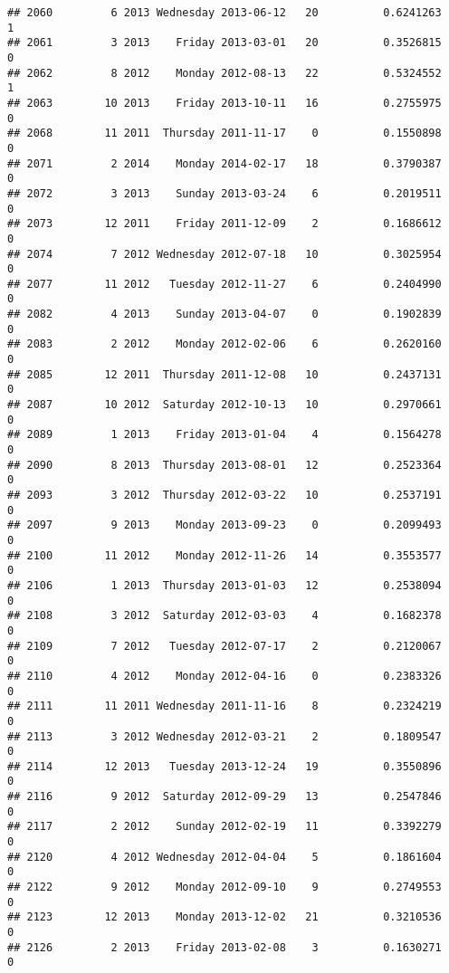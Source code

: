 \documentclass[
]{article}
\begin{document}
\begin{verbatim}
## 2060         6 2013 Wednesday 2013-06-12   20          0.6241263             1
## 2061         3 2013    Friday 2013-03-01   20          0.3526815             0
## 2062         8 2012    Monday 2012-08-13   22          0.5324552             1
## 2063        10 2013    Friday 2013-10-11   16          0.2755975             0
## 2068        11 2011  Thursday 2011-11-17    0          0.1550898             0
## 2071         2 2014    Monday 2014-02-17   18          0.3790387             0
## 2072         3 2013    Sunday 2013-03-24    6          0.2019511             0
## 2073        12 2011    Friday 2011-12-09    2          0.1686612             0
## 2074         7 2012 Wednesday 2012-07-18   10          0.3025954             0
## 2077        11 2012   Tuesday 2012-11-27    6          0.2404990             0
## 2082         4 2013    Sunday 2013-04-07    0          0.1902839             0
## 2083         2 2012    Monday 2012-02-06    6          0.2620160             0
## 2085        12 2011  Thursday 2011-12-08   10          0.2437131             0
## 2087        10 2012  Saturday 2012-10-13   10          0.2970661             0
## 2089         1 2013    Friday 2013-01-04    4          0.1564278             0
## 2090         8 2013  Thursday 2013-08-01   12          0.2523364             0
## 2093         3 2012  Thursday 2012-03-22   10          0.2537191             0
## 2097         9 2013    Monday 2013-09-23    0          0.2099493             0
## 2100        11 2012    Monday 2012-11-26   14          0.3553577             0
## 2106         1 2013  Thursday 2013-01-03   12          0.2538094             0
## 2108         3 2012  Saturday 2012-03-03    4          0.1682378             0
## 2109         7 2012   Tuesday 2012-07-17    2          0.2120067             0
## 2110         4 2012    Monday 2012-04-16    0          0.2383326             0
## 2111        11 2011 Wednesday 2011-11-16    8          0.2324219             0
## 2113         3 2012 Wednesday 2012-03-21    2          0.1809547             0
## 2114        12 2013   Tuesday 2013-12-24   19          0.3550896             0
## 2116         9 2012  Saturday 2012-09-29   13          0.2547846             0
## 2117         2 2012    Sunday 2012-02-19   11          0.3392279             0
## 2120         4 2012 Wednesday 2012-04-04    5          0.1861604             0
## 2122         9 2012    Monday 2012-09-10    9          0.2749553             0
## 2123        12 2013    Monday 2013-12-02   21          0.3210536             0
## 2126         2 2013    Friday 2013-02-08    3          0.1630271             0

\end{verbatim}
\end{document}
